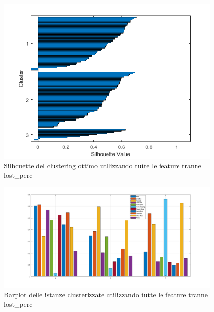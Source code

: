 \documentclass[a4paper,12pt,openany,oneside]{book}
\begin{document}
\begin{figure}[H]
	\includegraphics[width=\linewidth]{pics/no11/silhouette.png}
	\caption{Silhouette del clustering ottimo utilizzando tutte le feature tranne lost\_perc}
	\label{fig:silhouette_3}
\end{figure}
\begin{figure}[H]
	\includegraphics[width=\linewidth]{pics/no11/barplot.png}
	\caption{Barplot delle istanze clusterizzate utilizzando tutte le feature tranne lost\_perc}
	\label{fig:baroplot_3}
\end{figure}
\end{document}
